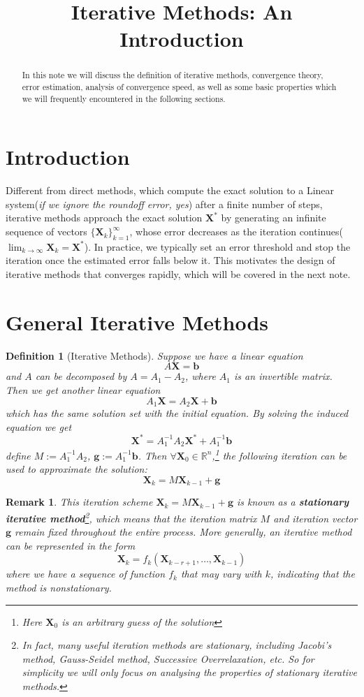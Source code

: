 \documentclass[12pt]{amsart}
\title{Iterative Methods: An Introduction}
\newtheorem{definition}{Definition}[section]
\newtheorem{remark}{Remark}[section]
\begin{document}
\maketitle

\begin{abstract}
    In this note we will discuss the definition of iterative methods, convergence theory, error estimation, analysis of convergence speed, as well as some
    basic properties which we will frequently encountered in the following sections.
    \end{abstract}

\section{Introduction}
Different from direct methods, which compute the exact solution to a Linear system({\small{\itshape if we ignore the roundoff error, yes}}) after a finite number 
of steps, iterative methods approach the exact solution $\bm{X}^*$ by generating an infinite sequence of vectors $\{\bm{X}_k \}_{k=1}^\infty $, whose error decreases 
as the iteration continues($\lim_{k \to \infty}\bm{X}_k = \bm{X}^* $). In practice, we typically set an error threshold and stop the iteration once the estimated error  
falls below it. This motivates the design of iterative methods that converges rapidly, which will be covered in the next note.

\section{General Iterative Methods}
\begin{definition}[Iterative Methods]
    Suppose we have a linear equation \[A\bm{X}=\bm{b}\] and $A$ can be decomposed by $A=A_1-A_2$, where $A_1$ is an invertible 
    matrix. Then we get another linear equation \[A_1\bm{X}=A_2\bm{X}+\bm{b}\] which has the same solution set with the initial equation.
    By solving the induced equation we get \[\bm{X}^*=A_1^{-1}A_2\bm{X}^*+A_1^{-1}\bm{b}\]
    define $M:=A_1^{-1}A_2$, $\bm{g}:=A_1^{-1}\bm{b}$. Then $\forall \bm{X}_0 \in \mathbb{R}^n$,\footnote{Here $\bm{X}_0$ is an arbitrary guess of the solution}  the following iteration can be used to approximate the solution:
    \[\bm{X}_k=M\bm{X}_{k-1}+\bm{g}\]

\end{definition}

\begin{remark}
    This iteration scheme $\bm{X}_k=M\bm{X}_{k-1}+\bm{g}$ is known as a \textbf{stationary iterative method}\footnote{In fact, many useful iteration methods are stationary, including Jacobi's method, Gauss-Seidel method, Successive Overrelaxation, etc. So for simplicity we will only focus on analysing the properties of stationary iterative methods.}, 
    which means that the iteration matrix $M$ and iteration vector $\bm{g}$ remain fixed throughout the entire process. More generally, 
    an iterative method can be represented in the form
    \[\bm{X}_k=f_k(\bm{X}_{k-r+1},\dots,\bm{X}_{k-1})\] where we have a sequence of function ${f_k}$ that may vary with $k$, indicating that 
    the method is nonstationary. 
\end{remark}
\end{document}
